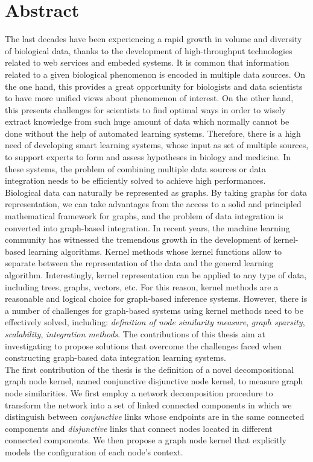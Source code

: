 \chapter*{Abstract}
The last decades have been experiencing a rapid growth in volume and diversity of biological data, thanks to the development of high-throughput technologies related to web services and embeded systems. It is common that information related to a given biological phenomenon is encoded in multiple data sources. On the one hand, this provides a great opportunity for biologists and data scientists to have more unified views about phenomenon of interest. On the other hand, this presents challenges for scientists to find optimal ways in order to wisely extract knowledge from such huge amount of data which normally cannot be done without the help of automated learning systems. Therefore, there is a high need of developing smart learning systems, whose input as set of multiple sources, to support experts to form and assess hypotheses in biology and medicine. In these systems, the problem of combining multiple data sources or data integration needs to be efficiently solved to achieve high performances.\\

Biological data can naturally be represented as graphs. By taking graphs for data representation, we can take advantages from the access to a solid and principled mathematical framework for graphs, and the problem of data integration is converted into graph-based integration. In recent years, the machine learning community has witnessed the tremendous growth in the development of kernel-based learning algorithms. Kernel methods whose kernel functions allow to separate between the representation of the data and the general learning algorithm. Interestingly, kernel representation can be applied to any type of data, including trees, graphs, vectors, etc. For this reason, kernel methods are a reasonable and logical choice for graph-based inference systems. However, there is a number of challenges for graph-based systems using kernel methods need to be effectively solved, including: \textit{definition of node similarity measure}, \textit{graph sparsity}, \textit{scalability}, \textit{integration methods}. The contributions of this thesis aim at investigating to propose solutions that overcome the challenges faced when constructing graph-based data integration learning systems.\\

The first contribution of the thesis is the definition of a novel decompositional graph node kernel, named conjunctive disjunctive node kernel, to measure graph node similarities. We first employ a network decomposition procedure to transform the network into a set of linked connected components in which we distinguish between \textit{conjunctive} links whose endpoints are in the same connected components and \textit{disjunctive} links that connect nodes located in different connected components. We then propose a graph node kernel that explicitly models the configuration of each node’s context.\\

